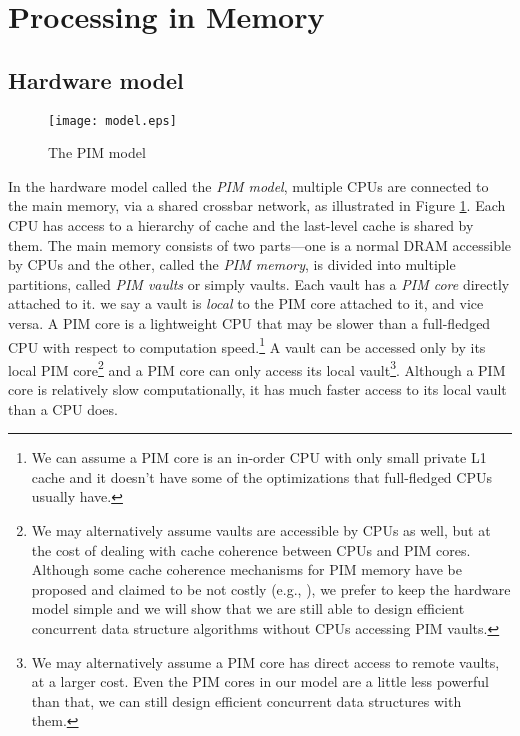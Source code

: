\section{Processing in Memory}
\label{section:model}

\subsection{Hardware model}
\label{section:hardware_model}

\begin{figure}[ht!]
\centering
\texttt{[image: model.eps]}
\caption{The PIM model}
\label{figure:model}
\end{figure}


In the hardware model called the \emph{PIM model}, multiple CPUs are connected to the main
memory, via a shared crossbar network, as illustrated in Figure \ref{figure:model}.
Each CPU has access to a hierarchy of cache and
the last-level cache is shared by them. 
The main memory consists of two parts---one is a normal DRAM accessible by CPUs 
and the other, called the \emph{PIM memory}, is divided into multiple partitions, 
called \emph{PIM vaults} or simply vaults.  
Each vault has a \emph{PIM core} directly attached to it.
we say a vault is \emph{local} to the PIM core attached to it, and vice versa.
A PIM core is a lightweight CPU that may be slower than a full-fledged CPU
with respect to computation speed.\footnote{
We can assume a PIM core is an in-order CPU with only small private L1 cache and 
it doesn't have some of the optimizations that full-fledged CPUs usually have.}
A vault can be accessed only by its local PIM core\footnote{
We may alternatively assume vaults are accessible by CPUs as well, 
but at the cost of dealing with cache coherence between CPUs and PIM cores. 
Although some cache coherence mechanisms for PIM memory have be proposed 
and claimed to be not costly (e.g., \cite{boroumand2016}), 
we prefer to keep the hardware model simple and we will show that we are still able to 
design efficient concurrent data structure algorithms without CPUs accessing PIM vaults. }
and a PIM core can only access its local vault\footnote{
We may alternatively assume a PIM core has direct access to remote vaults,
at a larger cost. Even the PIM cores in our model are a little less powerful than that,
we can still design efficient concurrent data structures with them.}.
Although a PIM core is relatively slow computationally,
it has much faster access to its local vault than a CPU does.

